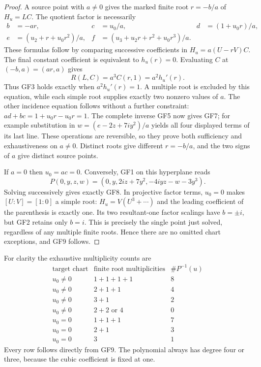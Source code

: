\documentclass[11pt]{article}
\begin{document}
\begin{proof}
A source point with $a\ne0$ gives the marked finite root
$r=-b/a$ of $H_u=LC$. The quotient factor is necessarily
\begin{align*}
 b&=-ar,&c&=u_0/a,&d&=(1+u_0r)/a,\\
 e&=(u_2+r+u_0r^2)/a,&
 f&=(u_3+u_2r+r^2+u_0r^3)/a.
\end{align*}
These formulas follow by comparing successive coefficients in
$H_u=a(U-rV)C$. The final constant coefficient is equivalent to
$h_u(r)=0$. Evaluating $C$ at $(-b,a)=(ar,a)$ gives
\[
 R(L,C)=a^3 C(r,1)=a^2 h_u'(r).
\]
Thus GF3 holds exactly when $a^2h_u'(r)=1$. A multiple root is
excluded by this equation, while each simple root supplies exactly
two nonzero values of $a$. The other incidence equation follows
without a further constraint:
$ad+bc=1+u_0r-u_0r=1$. The complete inverse GF5 now gives GF7;
for example substitution in $w=(e-2z+7iy^2)/a$ yields all four
displayed terms of its last line. These operations are reversible,
so they prove both sufficiency and exhaustiveness on $a\ne0$.
Distinct roots give different $r=-b/a$, and the two signs of $a$
give distinct source points.

If $a=0$ then $u_0=ac=0$. Conversely, GF1 on this hyperplane reads
\[
 P(0,y,z,w)=(0,y,2iz+7y^2,-4iyz-w-3y^3).
\]
Solving successively gives exactly GF8. In projective factor terms,
$u_0=0$ makes $[U:V]=[1:0]$ a simple root: $H_u=V(U^3+\cdots)$
and the leading coefficient of the parenthesis is exactly one.
Its two resultant-one factor scalings have $b=\pm i$, but GF2
retains only $b=i$. This is precisely the single point just solved,
regardless of any multiple finite roots. Hence there are no omitted
chart exceptions, and GF9 follows.
\end{proof}

For clarity the exhaustive multiplicity counts are
\[
\begin{array}{c|c|c}
\text{target chart}&\text{finite root multiplicities}&\#P^{-1}(u)\\\hline
u_0\ne0&1+1+1+1&8\\
u_0\ne0&2+1+1&4\\
u_0\ne0&3+1&2\\
u_0\ne0&2+2\text{ or }4&0\\\hline
u_0=0&1+1+1&7\\
u_0=0&2+1&3\\
u_0=0&3&1
\end{array}
\]
Every row follows directly from GF9. The polynomial always has
degree four or three, because the cubic coefficient is fixed at one.
\end{document}

